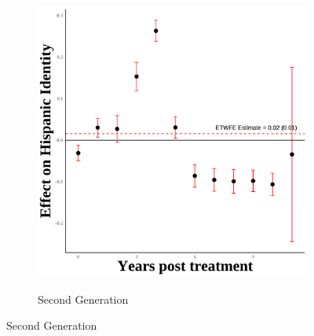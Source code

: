 \documentclass[12pt,english]{article}
\begin{document}
\begin{figure}[H]
\begin{subfigure}[b]{0.30\textwidth}
    \label{fig:hispanic-event-study-first}
  \end{subfigure}
  \hfill %
  \begin{subfigure}[b]{0.30\textwidth}
    \centering
    \caption{Second Generation}
    \includegraphics[width=\linewidth]{figures/secondgen-hispanic_event_study.png}
    \label{fig:hispanic-event-study-second}
  \end{subfigure}

  \vspace{0.3cm} %


\end{figure}
\end{document}
